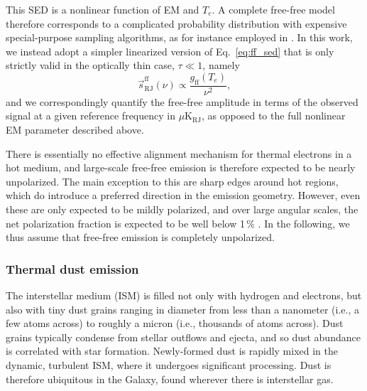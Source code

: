 \documentclass[onecolumn]{aa}
\newcommand{\s}[0]{\vec{s}}
\begin{document}
This SED is a nonlinear function of EM and $T_{e}$. A complete
free-free model therefore corresponds to a complicated probability
distribution with expensive special-purpose sampling algorithms, as
for instance employed in \citet{planck2014-a11}. In this work, we
instead adopt a simpler linearized version of Eq.~\eqref{eq:ff_sed} that
is only strictly valid in the optically thin case, $\tau \ll 1$, namely
\begin{equation}
  \s^{\mathrm{ff}}_{\mathrm{RJ}}(\nu) \propto\frac{g_{\mathrm{ff}}(T_e)}{\nu^2},
  \label{eq:ff_sed_linear}
\end{equation}
and we correspondingly quantify the free-free amplitude in terms of
the observed signal at a given reference frequency in
$\mu\mathrm{K}_{\mathrm{RJ}}$, as opposed to the full nonlinear EM
parameter described above.

There is essentially no effective alignment mechanism for thermal
electrons in a hot medium, and large-scale free-free emission is
therefore expected to be nearly unpolarized. The main exception to
this are sharp edges around hot  regions, which do
introduce a preferred direction in the emission geometry. However,
even these are only expected to be mildly polarized, and over large
angular scales, the net polarization fraction is expected to be well
below 1\,\% \citep[see discussion in][]{keating1998}. In the
following, we thus assume that free-free emission is completely
unpolarized.

\subsubsection{Thermal dust emission}
\label{sec:dust}

The interstellar medium (ISM) is filled not only with hydrogen and
electrons, but also with tiny dust grains ranging in diameter from less 
than a nanometer (i.e., a few atoms across) to roughly a micron (i.e.,
thousands of atoms across). Dust grains typically condense
from stellar outflows and ejecta, and so dust abundance is correlated
with star formation. Newly-formed dust is rapidly mixed in the dynamic,
turbulent ISM, where it undergoes significant processing. Dust is
therefore ubiquitous in the Galaxy, found wherever there is interstellar
gas. 
\end{document}
